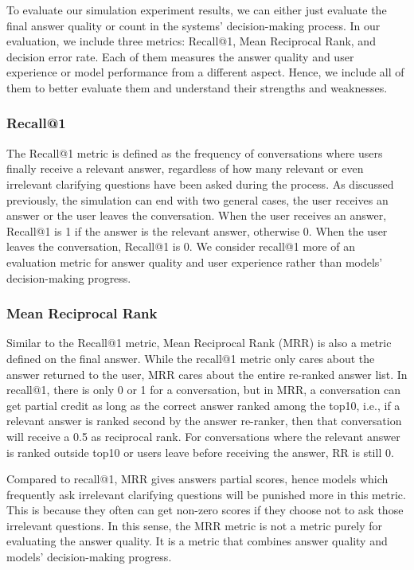 \documentclass[format=acmsmall, review=False, screen=true]{acmart}
\begin{document}
To evaluate our simulation experiment results, we can either just evaluate the final answer quality or count in the systems' decision-making process. In our evaluation, we include three metrics: Recall@1, Mean Reciprocal Rank, and decision error rate. Each of them measures the answer quality and user experience or model performance from a different aspect. Hence, we include all of them to better evaluate them and understand their strengths and weaknesses.

\subsubsection{\textbf{Recall@1}}
The Recall@1 metric is defined as the frequency of conversations where users finally receive a relevant answer, regardless of how many relevant or even irrelevant clarifying questions have been asked during the process. As discussed previously, the simulation can end with two general cases, the user receives an answer or the user leaves the conversation. When the user receives an answer, Recall@1 is 1 if the answer is the relevant answer, otherwise 0. When the user leaves the conversation, Recall@1 is 0. We consider recall@1 more of an evaluation metric for answer quality and user experience rather than models' decision-making progress.


\subsubsection{\textbf{Mean Reciprocal Rank}}
Similar to the Recall@1 metric, Mean Reciprocal Rank (MRR) is also a metric defined on the final answer. While the recall@1 metric only cares about the answer returned to the user, MRR cares about the entire re-ranked answer list. In recall@1, there is only 0 or 1 for a conversation, but in MRR, a conversation can get partial credit as long as the correct answer ranked among the top10, i.e., if a relevant answer is ranked second by the answer re-ranker, then that conversation will receive a 0.5 as reciprocal rank. For conversations where the relevant answer is ranked outside top10 or users leave before receiving the answer, RR is still 0. 

Compared to recall@1, MRR gives answers partial scores, hence models which frequently ask irrelevant clarifying questions will be punished more in this metric. This is because they often can get non-zero scores if they choose not to ask those irrelevant questions. In this sense, the MRR metric is not a metric purely for evaluating the answer quality. It is a metric that combines answer quality and models' decision-making progress.
\end{document}
